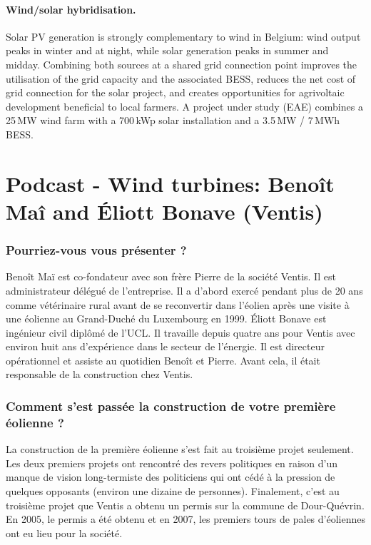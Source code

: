 \paragraph{Wind/solar hybridisation.}
Solar PV generation is strongly complementary to wind in Belgium: wind output peaks in winter
and at night, while solar generation peaks in summer and midday. Combining both sources at a
shared grid connection point improves the utilisation of the grid capacity and the associated
BESS, reduces the net cost of grid connection for the solar project, and creates opportunities
for agrivoltaic development beneficial to local farmers. A project under study (EAE) combines
a 25\,MW wind farm with a 700\,kWp solar installation and a 3.5\,MW / 7\,MWh BESS.




\section{Podcast - Wind turbines: Beno\^it Ma\^i and \'{E}liott Bonave (Ventis)}

\subsubsection{Pourriez-vous vous présenter ?}

Benoît Maï est co-fondateur avec son frère Pierre de la société Ventis. Il est administrateur délégué de l'entreprise. Il a d'abord exercé pendant plus de 20 ans comme vétérinaire rural avant de se reconvertir dans l'éolien après une visite à une éolienne au Grand-Duché du Luxembourg en 1999. Éliott Bonave est ingénieur civil diplômé de l'UCL. Il travaille depuis quatre ans pour Ventis avec environ huit ans d'expérience dans le secteur de l'énergie. Il est directeur opérationnel et assiste au quotidien Benoît et Pierre. Avant cela, il était responsable de la construction chez Ventis.

\subsubsection{Comment s'est passée la construction de votre première éolienne ?}

La construction de la première éolienne s'est fait au troisième projet seulement. Les deux premiers projets ont rencontré des revers politiques en raison d'un manque de vision long-termiste des politiciens qui ont cédé à la pression de quelques opposants (environ une dizaine de personnes). Finalement, c'est au troisième projet que Ventis a obtenu un permis sur la commune de Dour-Quévrin. En 2005, le permis a été obtenu et en 2007, les premiers tours de pales d'éoliennes ont eu lieu pour la société.

